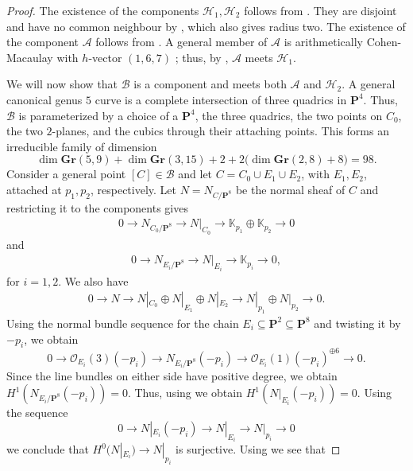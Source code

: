 \documentclass[leqno,11pt,a4paper]{amsart}
\theoremstyle{definition}
\numberwithin{equation}{section}
\newcommand{\Gr}{\mathbf{Gr}}
\newcommand{\kk}{\mathbb{K}}
\newcommand{\PP}{\mathbf{P}}
\newcommand{\OO}{\mathscr{O}}
\newcommand{\HH}{\mathcal{H}}
\begin{document}
\begin{proof}
The existence of the  components $\HH_1,\HH_2$ follows from .
They are disjoint and have no common neighbour by , which also gives radius two.
The existence of the component $\mathcal A$ follows from .  
A general member of $\mathcal{A}$ is arithmetically Cohen-Macaulay with $h$-vector $(1,6,7)$ \cite[Corollary~8.4]{eisenbud:syzygies}; thus, by , $\mathcal{A}$ meets $\HH_1$.

We will now show that $\mathcal{B}$ is a component and meets both $\mathcal{A}$ and $\HH_2$.
A general canonical genus $5$ curve is a complete intersection of three quadrics in $\PP^4$. Thus, $\mathcal{B}$ is parameterized by a choice of a $\PP^4$, the three quadrics, the two points on $C_0$, the two $2$-planes, and the cubics through their attaching points. This forms an irreducible family of dimension
$$
\dim\Gr(5,9)+\dim\Gr(3,15)+2 +2\bigl(\dim\Gr(2,8)+8\bigr)=98.
$$
Consider a general point $[C] \in \mathcal{B}$ and let $C=C_0\cup E_1\cup E_2$, with $E_1,E_2$, attached at $p_1,p_2$, respectively. 
Let $N = N_{C/\PP^8}$ be the normal sheaf of $C$ and restricting it to the components gives
\begin{align} \label{C_0res}
0\longrightarrow N_{C_0/\PP^8} \longrightarrow N|_{C_0} \longrightarrow \kk_{p_1}\oplus\kk_{p_2} \longrightarrow0
\end{align}
and
\begin{align} \label{E_res}
0\longrightarrow N_{E_i/\PP^8} \longrightarrow N|_{E_i} \longrightarrow\kk_{p_i} \longrightarrow0,
\end{align}
for $i=1,2$.
We also have
\begin{align} \label{nor_res}
0\longrightarrow N \longrightarrow N|_{C_0}\oplus N|_{E_1}\oplus N|_{E_2} \longrightarrow N|_{p_1}\oplus N|_{p_2} \longrightarrow 0.
\end{align}
Using the normal bundle sequence for the chain $E_i\subseteq\PP^2\subseteq\PP^8$ and twisting it by $-p_i$, we obtain 
$$
0\longrightarrow\OO_{E_i}(3)(-p_i) \longrightarrow N_{E_i/\PP^8}(-p_i) \longrightarrow\OO_{E_i}(1)(-p_i)^{\oplus6} \longrightarrow0.
$$
Since the line bundles on either side have positive degree,  we obtain $H^1(N_{E_i/\PP^8}(-p_i))=0$.
Thus, using  we obtain $H^1(N|_{E_i}(-p_i))=0$.
Using the sequence 
$$
0 \longrightarrow N|_{E_i}(-p_i) \longrightarrow N|_{E_i} \longrightarrow N|_{p_i} \longrightarrow 0
$$
we conclude that  $H^0(N|_{E_i})\to N|_{p_i}$ is surjective. Using  we see that 

\end{proof}
\end{document}
